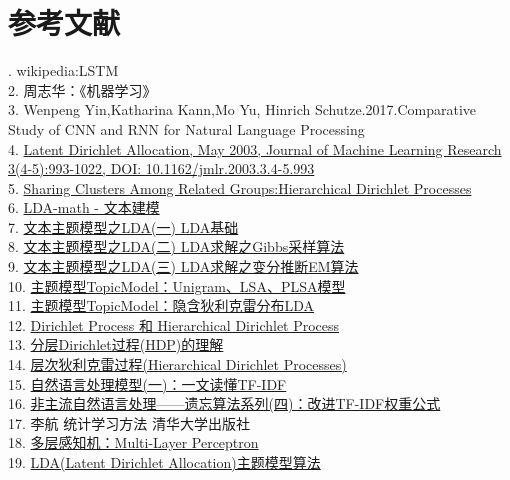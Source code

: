 \documentclass[a4paper]{article}
\begin{document}
   \section{参考文献}
   . wikipedia:LSTM\\
   2. 周志华：《机器学习》\\
   3. Wenpeng Yin,Katharina Kann,Mo Yu, Hinrich Schutze.2017.Comparative Study of CNN and RNN for Natural Language Processing  \\
   4. \href {http://www.jmlr.org/papers/volume3/blei03a/blei03a.pdf}
   {Latent Dirichlet Allocation, May 2003, Journal of Machine Learning Research 3(4-5):993-1022, DOI: 10.1162/jmlr.2003.3.4-5.993}\\
   5. \href {http://papers.nips.cc/paper/2698-sharing-clusters-among-related-groups-hierarchical-dirichlet-processes.pdf}
   {Sharing Clusters Among Related Groups:Hierarchical Dirichlet Processes}\\
   6. \href {https://cosx.org/2013/03/lda-math-text-modeling/}
   {LDA-math - 文本建模}\\
   7. \href {http://www.cnblogs.com/pinard/p/6831308.html}
   {文本主题模型之LDA(一) LDA基础}\\
   8. \href {http://www.cnblogs.com/pinard/p/6867828.html}
   {文本主题模型之LDA(二) LDA求解之Gibbs采样算法}\\
   9. \href {http://www.cnblogs.com/pinard/p/6873703.html}
   {文本主题模型之LDA(三) LDA求解之变分推断EM算法}\\
   10. \href {https://blog.csdn.net/pipisorry/article/details/42560693}
   {主题模型TopicModel：Unigram、LSA、PLSA模型}\\
   11. \href {https://blog.csdn.net/pipisorry/article/details/42649657}
   {主题模型TopicModel：隐含狄利克雷分布LDA}\\
   12. \href {https://www.cnblogs.com/jiang1st2010/archive/2013/05/12/3076331.html}
   {Dirichlet Process 和 Hierarchical Dirichlet Process}\\
   13. \href {https://blog.csdn.net/sysuhu/article/details/54378468}
   {分层Dirichlet过程(HDP)的理解}\\
   14. \href {http://www.datalearner.com/blog/1051487944219663}
   {层次狄利克雷过程(Hierarchical Dirichlet Processes)}\\
   15. \href {https://blog.csdn.net/u012845311/article/details/73548882}
   {自然语言处理模型(一)：一文读懂TF-IDF} \\
   16. \href {http://www.52nlp.cn/tag/tf-idf}
   {非主流自然语言处理——遗忘算法系列(四)：改进TF-IDF权重公式}\\   
   17. 李航 统计学习方法 清华大学出版社\\
   18. \href {https://blog.csdn.net/xholes/article/details/78461164}
   {多层感知机：Multi-Layer Perceptron}\\
   19. \href {http://blog.sina.com.cn/s/blog\_8eee7fb60101czhx.html}
   {LDA(Latent Dirichlet Allocation)主题模型算法}
   
   
   
\end{document}
